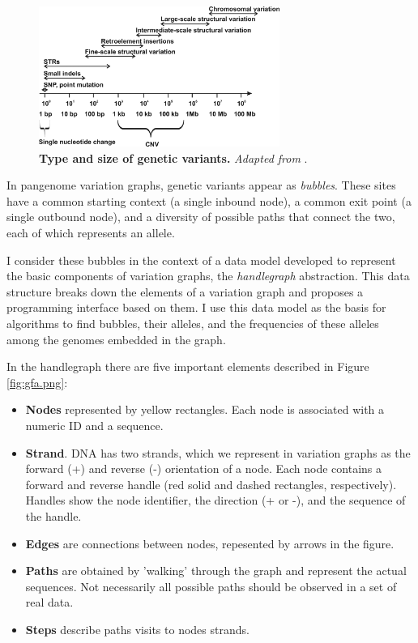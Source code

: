 \begin{figure}[H]
\centering
\includegraphics[width=0.7\textwidth]{fig/typeOfVariants.jpeg}
\decoRule
\caption{\textbf{Type and size of genetic variants.} \textit{Adapted from} \cite{pollex2007copy}.} 
\label{fig:typeOfVariants}
\end{figure}

In pangenome variation graphs, genetic variants appear as \textit{bubbles}. These sites have a common starting context (a single inbound node), a common exit point (a single outbound node), and a diversity of possible paths that connect the two, each of which represents an allele.

I consider these bubbles in the context of a data model developed to represent the basic components of variation graphs, the \emph{handlegraph} abstraction.
This data structure breaks down the elements of a variation graph and proposes a programming interface based on them.
I use this data model as the basis for algorithms to find bubbles, their alleles, and the frequencies of these alleles among the genomes embedded in the graph.

In the handlegraph there are five important elements described in Figure \ref{fig:gfa.png}:
\begin{itemize}
\item\textbf{Nodes} represented by yellow rectangles. Each node is associated with a numeric ID and a sequence. 

\item\textbf{Strand}. DNA has two strands, which we represent in variation graphs as the forward (+) and reverse (-) orientation of a node. Each node contains a forward and reverse handle (red solid and dashed rectangles, respectively). Handles show the node identifier, the direction (+ or -), and the sequence of the handle.

\item\textbf{Edges} are connections between nodes, repesented by arrows in the figure.

\item\textbf{Paths} are obtained by 'walking' through the graph and represent the actual sequences. Not necessarily all possible paths should be observed in a set of real data.

\item\textbf{Steps} describe paths visits to nodes strands.
\end{itemize}

